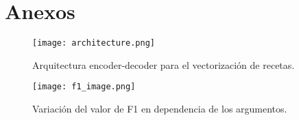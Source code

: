 \documentclass[
	a4paper, %
	10pt, %
	unnumberedsections, %
	twoside, %
]{LTJournalArticle}
\begin{document}
\section{Anexos}

\begin{figure*}
	\texttt{[image: architecture.png]}
	\caption{Arquitectura encoder-decoder para el vectorización de recetas.}
	\label{fig:encoder_decoder}
\end{figure*}


\begin{figure}
	\texttt{[image: f1\_image.png]}
	\caption{Variación del valor de F1 en dependencia de los argumentos.}
	\label{fig:f1_plot}
\end{figure}
\end{document}
